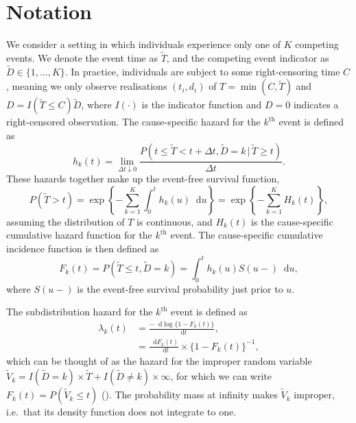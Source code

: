 \documentclass[
  letterpaper,
  DIV=11,
  numbers=noendperiod]{scrreprt}
\newcommand{\given}{\,|\,}
\newcommand\diff{\mathop{}\!\mathrm{d}}
\begin{document}
\section{Notation}\label{sec-notation}

We consider a setting in which individuals experience only one of \(K\)
competing events. We denote the event time as \(\tilde{T}\), and the
competing event indicator as \(\tilde{D} \in \{1,...,K\}\). In practice,
individuals are subject to some right-censoring time \(C\), meaning we
only observe realisations \((t_i, d_i)\) of \(T = \min(C,\tilde{T})\)
and \(D = I(\tilde{T} \leq C)\tilde{D}\), where \(I(\cdot)\) is the
indicator function and \(D = 0\) indicates a right-censored observation.
The cause-specific hazard for the \(k^{\text{th}}\) event is defined
as\\
\begin{equation*} 
    h_k(t) = \lim_{\Delta t \downarrow 0} \frac{P(t \leq \tilde{T} < t + \Delta t, \tilde{D} = k \given \tilde{T} \geq t)}{\Delta t}.
\end{equation*} These hazards together make up the event-free survival
function, \begin{equation*}
    P(\tilde{T} > t) = \exp \left\{ - \sum_{k = 1}^{K} \int_{0}^{t} h_k(u)\diff u \right\} = \exp \left\{ - \sum_{k = 1}^{K} H_k(t) \right\},
\end{equation*} assuming the distribution of \(T\) is continuous, and
\(H_k(t)\) is the cause-specific cumulative hazard function for the
\(k^{\text{th}}\) event. The cause-specific cumulative incidence
function is then defined as \begin{equation*}
    F_k(t) = P(\tilde{T} \leq t, \tilde{D} = k) = \int_{0}^{t}h_k(u)S(u-)\diff u,
\end{equation*} where \(S(u-)\) is the event-free survival probability
just prior to \(u\).

The subdistribution hazard for the \(k^{\text{th}}\) event is defined as
\begin{align*}
    \lambda_k(t) &= \frac{-\diff \log \{1 - F_k(t)\}}{\diff t}, \\
    &= \frac{\diff F_k(t)}{\diff t} \times \{1 - F_k(t)\}^{-1}, 
\end{align*} which can be thought of as the hazard for the improper
random variable
\(\tilde{V}_k = I(\tilde{D} = k) \times \tilde{T} + I(\tilde{D} \neq k) \times \infty\),
for which we can write \(F_k(t) = P(\tilde{V}_k \leq t)\)
(). The probability mass at infinity makes
\(\tilde{V}_k\) improper, i.e.~that its density function does not
integrate to one.
\end{document}
